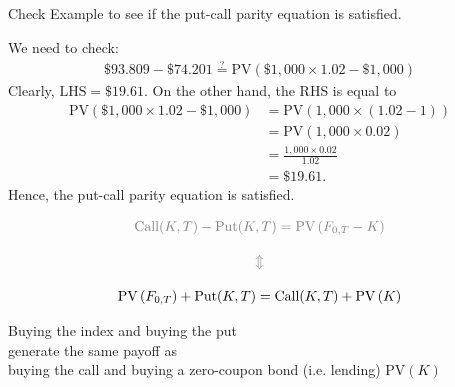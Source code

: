 \begin{frame}[fragile,t]
\begin{myexample}
	Check	Example  to see if the put-call parity equation is satisfied.
\end{myexample}
\bigskip
\pause
\begin{mysol}
	We need to check:
	\begin{align*}
		\$93.809 - \$74.201 \stackrel{?}{=} \text{PV}(\$1,000 \times 1.02- \$1,000)
	\end{align*}
	\pause
	Clearly, $\text{LHS}=\$19.61$. \pause On the other hand, the RHS is equal to
	\begin{align*}
		\text{PV}(\$1,000 \times 1.02- \$1,000) & = \text{PV}\left(1,000 \times (1.02-1)\right) \\
                                            & = \text{PV}\left(1,000 \times 0.02\right)     \\
                                            & = \frac{1,000 \times 0.02}{1.02}              \\
																						& = \$19.61.
	\end{align*}
	\pause
	Hence, the put-call parity equation is satisfied.\myEnd
\end{mysol}
\end{frame}
\begin{frame}[fragile,t]
	\begin{gather*}
		\textcolor{gray}{\text{Call}(K,T) - \text{Put}(K,T) = \text{PV}\left(F_{0,T}-K\right)} \\[1em]
		\textcolor{gray}{\Updownarrow}\\[1em]
		\text{PV}\left(F_{0,T}\right) +	\text{Put}(K,T) = \text{Call}(K,T) + \text{PV}\left(K\right)
	\end{gather*}

	\bigskip
	\mySeparateLine
	\bigskip

	\begin{center}
		Buying the index and buying the put \\
		\bigskip
		generate the same payoff as\\
		\bigskip
		buying the call and buying a zero-coupon bond (i.e. lending) $\text{PV}(K)$
	\end{center}
\end{frame}
